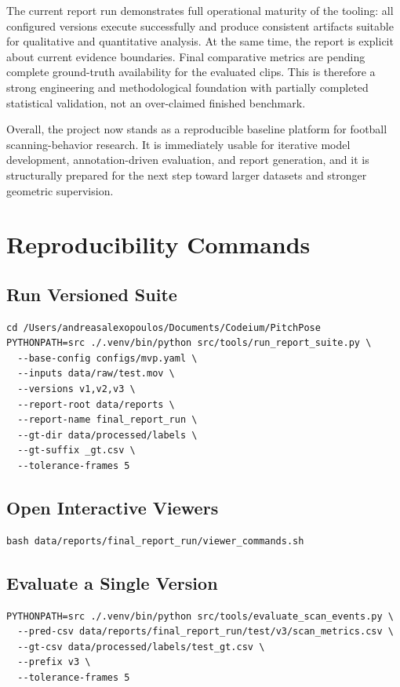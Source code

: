 \documentclass[11pt,a4paper]{article}
\begin{document}
The current report run demonstrates full operational maturity of the tooling: all configured versions execute successfully and produce consistent artifacts suitable for qualitative and quantitative analysis. At the same time, the report is explicit about current evidence boundaries. Final comparative metrics are pending complete ground-truth availability for the evaluated clips. This is therefore a strong engineering and methodological foundation with partially completed statistical validation, not an over-claimed finished benchmark.

Overall, the project now stands as a reproducible baseline platform for football scanning-behavior research. It is immediately usable for iterative model development, annotation-driven evaluation, and report generation, and it is structurally prepared for the next step toward larger datasets and stronger geometric supervision.

\appendix
\section{Reproducibility Commands}

\subsection*{Run Versioned Suite}
\begin{lstlisting}[style=bashstyle]
cd /Users/andreasalexopoulos/Documents/Codeium/PitchPose
PYTHONPATH=src ./.venv/bin/python src/tools/run_report_suite.py \
  --base-config configs/mvp.yaml \
  --inputs data/raw/test.mov \
  --versions v1,v2,v3 \
  --report-root data/reports \
  --report-name final_report_run \
  --gt-dir data/processed/labels \
  --gt-suffix _gt.csv \
  --tolerance-frames 5
\end{lstlisting}

\subsection*{Open Interactive Viewers}
\begin{lstlisting}[style=bashstyle]
bash data/reports/final_report_run/viewer_commands.sh
\end{lstlisting}

\subsection*{Evaluate a Single Version}
\begin{lstlisting}[style=bashstyle]
PYTHONPATH=src ./.venv/bin/python src/tools/evaluate_scan_events.py \
  --pred-csv data/reports/final_report_run/test/v3/scan_metrics.csv \
  --gt-csv data/processed/labels/test_gt.csv \
  --prefix v3 \
  --tolerance-frames 5
\end{lstlisting}
\end{document}
